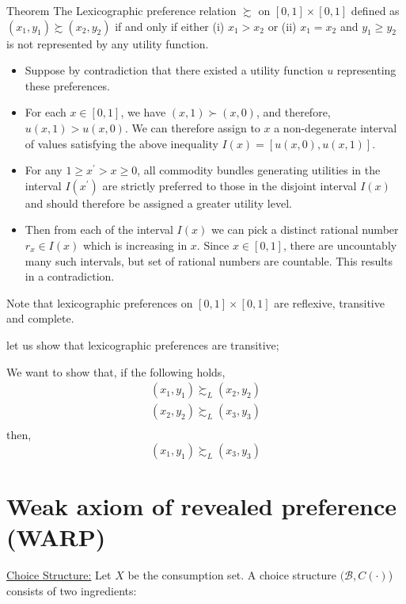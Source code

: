 \documentclass[12pt,a4paper,fleqn]{article}
\begin{document}
Theorem
  The Lexicographic preference relation \(\succsim \) on \([0,1] \times[0,1]\) defined as \(\left(x_1, y_1\right) \succsim\left(x_2, y_2\right)\) if and only if either (i) \(x_1>x_2\) or (ii) \(x_1=x_2\) and \(y_1 \geq y_2\) is not represented by any utility function.
\begin{itemize}
  \item Suppose by contradiction that there existed a utility function \(u\) representing these preferences.
  \item For each \(x \in[0,1]\), we have \((x, 1) \succ(x, 0)\), and therefore, \(u(x, 1)>u(x, 0)\). We can therefore assign to \(x\) a non-degenerate interval of values satisfying the above inequality \(I(x)=[u(x, 0), u(x, 1)]\).
  \item  For any \(1 \geq x^{\prime}>x \geq 0\), all commodity bundles generating utilities in the interval \(I\left(x^{\prime}\right)\) are strictly preferred to those in the disjoint interval \(I(x)\) and should therefore be assigned a greater utility level.
  \item Then from each of the interval \(I(x)\) we can pick a distinct rational number \(r_x \in I(x)\) which is increasing in \(x\). Since \(x \in[0,1]\), there are uncountably many such intervals, but set of rational numbers are countable. This results in a contradiction.
\end{itemize}

Note that lexicographic preferences on \([0,1] \times [0,1]\)  are reflexive, transitive and complete.

let us show that lexicographic preferences are transitive;

We want to show that, if the following holds,
\begin{equation*}
    \begin{split}
      (x_{1},y_{1}) \succsim_{L} (x_{2},y_{2}) \\
      (x_{2},y_{2}) \succsim_{L} (x_{3},y_{3})\\
    \end{split}
\end{equation*}    
then,\[(x_{1},y_{1}) \succsim_{L} (x_{3},y_{3})\]  

 \section{Weak axiom of revealed preference (WARP)} 

 \underline{Choice Structure:} Let \(X\) be the consumption set. A choice structure \((\mathcal{B}, C(\cdot)\)) consists of two ingredients:
\end{document}
